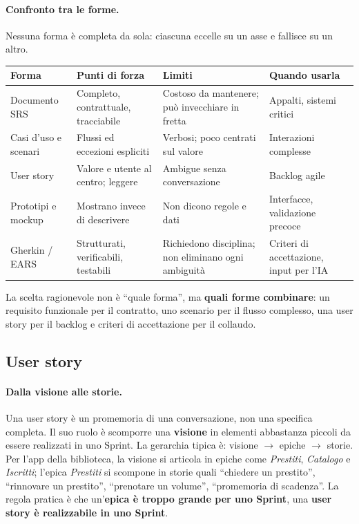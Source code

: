 \documentclass[12pt]{extarticle}
\begin{document}
\paragraph{Confronto tra le forme.}
Nessuna forma è completa da sola: ciascuna eccelle su un asse e fallisce su un altro.

\begin{center}
\small
\begin{tabular}{p{3.2cm}p{4.4cm}p{3.6cm}p{4.0cm}}
    \toprule
    \textbf{Forma} & \textbf{Punti di forza} & \textbf{Limiti} & \textbf{Quando usarla} \\
    \midrule
    Documento SRS & Completo, contrattuale, tracciabile & Costoso da mantenere; può invecchiare in fretta & Appalti, sistemi critici \\
    \addlinespace
    Casi d'uso e scenari & Flussi ed eccezioni espliciti & Verbosi; poco centrati sul valore & Interazioni complesse \\
    \addlinespace
    User story & Valore e utente al centro; leggere & Ambigue senza conversazione & Backlog agile \\
    \addlinespace
    Prototipi e mockup & Mostrano invece di descrivere & Non dicono regole e dati & Interfacce, validazione precoce \\
    \addlinespace
    Gherkin / EARS & Strutturati, verificabili, testabili & Richiedono disciplina; non eliminano ogni ambiguità & Criteri di accettazione, input per l'IA \\
    \bottomrule
\end{tabular}
\end{center}

\noindent La scelta ragionevole non è ``quale forma'', ma \textbf{quali forme combinare}: un requisito funzionale per il contratto, uno scenario per il flusso complesso, una user story per il backlog e criteri di accettazione per il collaudo.

\subsection{User story}

\paragraph{Dalla visione alle storie.}
Una user story è un promemoria di una conversazione, non una specifica completa. Il suo ruolo è scomporre una \textbf{visione} in elementi abbastanza piccoli da essere realizzati in uno Sprint. La gerarchia tipica è: visione $\rightarrow$ epiche \(\rightarrow\) storie. Per l'app della biblioteca, la visione si articola in epiche come \textit{Prestiti}, \textit{Catalogo} e \textit{Iscritti}; l'epica \textit{Prestiti} si scompone in storie quali ``chiedere un prestito'', ``rinnovare un prestito'', ``prenotare un volume'', ``promemoria di scadenza''. La regola pratica è che un'\textbf{epica è troppo grande per uno Sprint}, una \textbf{user story è realizzabile in uno Sprint}.
\end{document}
